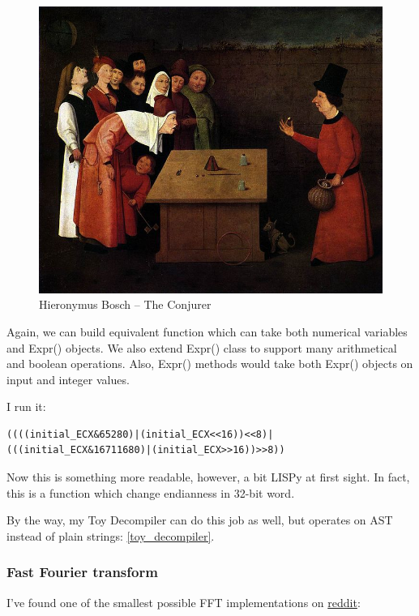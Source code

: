\begin{figure}[H]
\centering
\includegraphics[scale=2.5]{symbolic/2_assembly/718px-Conjurer_Bosch.jpg}
\caption{Hieronymus Bosch -- The Conjurer}
\end{figure}

Again, we can build equivalent function which can take both numerical variables and Expr() objects.
We also extend Expr() class to support many arithmetical and boolean operations.
Also, Expr() methods would take both Expr() objects on input and integer values.



I run it:

\begin{lstlisting}
((((initial_ECX&65280)|(initial_ECX<<16))<<8)|(((initial_ECX&16711680)|(initial_ECX>>16))>>8))
\end{lstlisting}

Now this is something more readable, however, a bit LISPy at first sight.
In fact, this is a function which change endianness in 32-bit word.

By the way, my Toy Decompiler can do this job as well, but operates on \ac{AST} instead
of plain strings: \ref{toy_decompiler}.

\subsubsection{Fast Fourier transform}

I've found one of the smallest possible FFT implementations on \href{https://www.reddit.com/r/Python/comments/1la4jp/understanding_the_fft_algorithm_with_python/}{reddit}:

